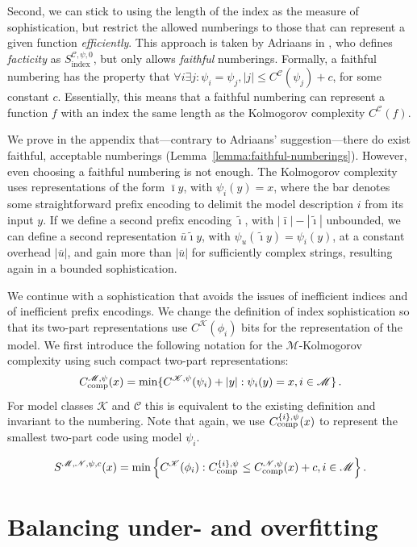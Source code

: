 \documentclass{style/llncs}
\newcommand{\M}{\mathscr M}
\newcommand{\C}{\mathscr C}
\newcommand{\K}{\mathscr K}
\newcommand{\Nm}{\mathscr N}
\newcommand{\tn}[1]{\textnormal{#1}}
\newcommand{\br}[1]{\overline{#1}}
\newcommand{\s}{S}
\newcommand{\Cc}{C_\tn{comp}}
\newcommand{\p}{\,\text{.}}
\begin{document}
Second, we can stick to using the length of the index as the measure of sophistication, but restrict the allowed numberings to those that can represent a given function \emph{efficiently}. This approach is taken by Adriaans in \cite{adriaans2012facticity}, who defines \emph{facticity} as $\s_\text{index}^{\C,\psi,0}$, but only allows \emph{faithful} numberings. Formally, a faithful numbering has the property that $\forall i \exists j : \psi_i=\psi_j, |j|\le C^{\C}(\psi_j)+c$, for some constant $c$. Essentially, this means that a faithful numbering can represent a function $f$ with an index the same length as the Kolmogorov complexity $C^\C(f)$.

We prove in the appendix that---contrary to Adriaans' suggestion---there do exist faithful, acceptable numberings (Lemma~\ref{lemma:faithful-numberings}). However, even choosing a faithful numbering is not enough. The Kolmogorov complexity uses representations of the form $\bar\imath y$, with $\psi_i(y) = x$,  where the bar denotes some straightforward prefix encoding to delimit the model description $i$ from its input $y$. If we define a second prefix encoding $\tilde{\imath}$, with $|\bar\imath|-|\tilde\imath|$ unbounded, we can define a second representation $\bar u \tilde \imath y$, with $\psi_u(\tilde{\imath} y) = \psi_i(y)$, at a constant overhead $|\br{u}|$, and gain more than $|\br{u}|$ for sufficiently complex strings, resulting again in a bounded sophistication.

We continue with a sophistication that avoids the issues of inefficient indices and of inefficient prefix encodings. We change the definition of index sophistication so that its two-part representations use $C^\K(\phi_i)$ bits for the representation of the model. We first introduce the following notation for the $\M$-Kolmogorov complexity using such compact two-part representations:
\[
\Cc^{\M, \psi}(x) = \min\{ C^{\K, \psi}(\psi_i) + |y| :  \psi_i(y) = x, i \in \M\}\p
\]
For model classes $\K$ and $\C$ this is equivalent to the existing definition and invariant to the numbering. Note that again, we use $\Cc^{\{i\}, \psi}(x)$ to represent the smallest two-part code using model $\psi_i$.

\begin{definition}[Sophistication]
\[
S^{\M,\Nm,\psi,c}(x)=\min\left\{C^\K(\phi_i): \Cc^{\{i\}, \psi} \le \Cc^{\Nm,\psi}(x)+c, i\in\M\right\}.
\]
\end{definition}

\section{Balancing under- and overfitting}
\label{section:balance}
\end{document}
